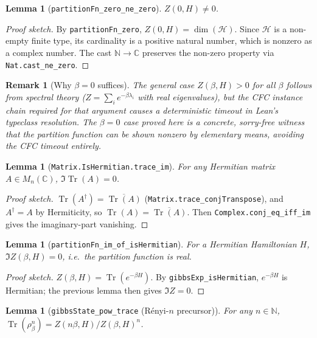 \documentclass[a4paper,11pt]{article}
\newtheorem{lemma}[theorem]{Lemma}
\newtheorem{remark}[theorem]{Remark}
\begin{document}
\begin{lemma}[\texttt{partitionFn\_zero\_ne\_zero}]
$Z(0, H) \neq 0$.
\end{lemma}

\begin{proof}[Proof sketch]
By \texttt{partitionFn\_zero}, $Z(0,H) = \dim(\mathcal{H})$.  Since
$\mathcal{H}$ is a non-empty finite type, its cardinality is a positive
natural number, which is nonzero as a complex number.  The cast
$\mathbb{N} \to \mathbb{C}$ preserves the non-zero property via
\texttt{Nat.cast\_ne\_zero}.
\end{proof}

\begin{remark}[Why $\beta = 0$ suffices]
The general case $Z(\beta, H) > 0$ for all $\beta$ follows from
spectral theory ($Z = \sum_i e^{-\beta\lambda_i}$ with real eigenvalues),
but the CFC instance chain required for that argument causes a
deterministic timeout in Lean's typeclass resolution.  The $\beta = 0$
case proved here is a concrete, sorry-free witness that the partition
function can be shown nonzero by elementary means, avoiding the CFC
timeout entirely.
\end{remark}

\begin{lemma}[\texttt{Matrix.IsHermitian.trace\_im}]
For any Hermitian matrix $A \in M_n(\mathbb{C})$,
$\Im\operatorname{Tr}(A) = 0$.
\end{lemma}

\begin{proof}[Proof sketch]
$\operatorname{Tr}(A^\dagger) = \overline{\operatorname{Tr}(A)}$
(\texttt{Matrix.trace\_conjTranspose}), and $A^\dagger = A$ by
Hermiticity, so $\operatorname{Tr}(A) = \overline{\operatorname{Tr}(A)}$.
Then \texttt{Complex.conj\_eq\_iff\_im} gives the imaginary-part
vanishing.
\end{proof}

\begin{lemma}[\texttt{partitionFn\_im\_of\_isHermitian}]
For a Hermitian Hamiltonian $H$,
$\Im Z(\beta, H) = 0$, i.e.\ the partition function is real.
\end{lemma}

\begin{proof}[Proof sketch]
$Z(\beta, H) = \operatorname{Tr}(e^{-\beta H})$.  By
\texttt{gibbsExp\_isHermitian}, $e^{-\beta H}$ is Hermitian; the
previous lemma then gives $\Im Z = 0$.
\end{proof}

\begin{lemma}[\texttt{gibbsState\_pow\_trace} (Rényi-$n$ precursor)]
For any $n \in \mathbb{N}$,
$\operatorname{Tr}(\rho_\beta^n)
 = Z(n\beta, H) / Z(\beta, H)^n$.
\end{lemma}
\end{document}
